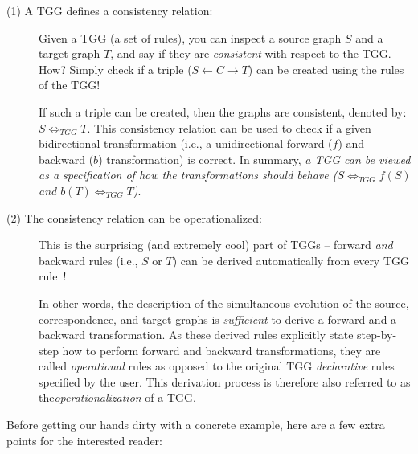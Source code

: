 \begin{description}

\item[(1) A TGG defines a consistency relation:]%
Given a TGG (a set of rul\-es), you can inspect a source graph $S$ and a target graph $T$, and say if they are \emph{consistent} with respect to the TGG. How?
Simply check if a triple ($S\leftarrow C\rightarrow T$) can be created using the rules of the TGG!

\vspace{0.25cm}

If such a triple can be created, then the graphs are consistent, denoted by: $S \Leftrightarrow_{TGG} T$. This consistency relation can be used to check if a
given bidirectional transformation (i.e., a unidirectional forward ($f$) and
backward ($b$) transformation) is correct. In summary, \emph{a TGG can be viewed as a specification of how the transformations \emph{should} behave ($S \Leftrightarrow_{TGG} f(S)$ and $b(T) \Leftrightarrow_{TGG} T$)}.
	
\item[(2) The consistency relation can be operationalized:]%
This is the surprising (and extremely cool) part of TGGs -- forward \emph{and} backward rules (i.e., $S$ or $T$) can be derived automatically from every TGG
rule~\cite{Giese2010,Hermann2011a}! 

\vspace{0.25cm}

In other words, the description of the simultaneous evolution of the source, correspondence, and target graphs is \emph{sufficient} to derive a forward and
a backward transformation. As these derived rules explicitly state step-by-step how to perform forward and backward transformations, they are called
\emph{operational} rules as opposed to the original TGG \emph{declarative} rules specified by the user. This derivation process is therefore also referred to
as the\emph{operationalization} of a TGG.
	
\end{description}

Before getting our hands dirty with a concrete example, here are a few extra points for the interested reader:  


